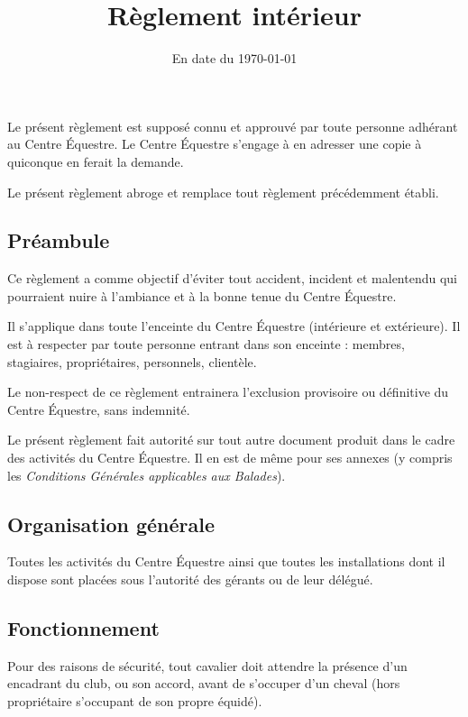 \documentclass[11pt,a4paper]{article}
\title[Règlement intérieur -- version du \today]{Règlement intérieur}
\subtitle{En date du \today}
\author{}
\date{}
\begin{document}

\maketitle


Le présent règlement est supposé connu et approuvé par toute personne adhérant au Centre Équestre.
Le Centre Équestre s'engage à en adresser une copie à quiconque en ferait la demande.

Le présent règlement abroge et remplace tout règlement précédemment établi.

\subsection*{Préambule}

Ce règlement a comme objectif d'éviter tout accident, incident et malentendu qui pourraient nuire à l'ambiance et à la bonne tenue du Centre Équestre.

Il s'applique dans toute l'enceinte du Centre Équestre (intérieure et extérieure).
Il est à respecter par toute personne entrant dans son enceinte : membres, stagiaires, propriétaires, personnels, clientèle.

Le non-respect de ce règlement entrainera l'exclusion provisoire ou définitive du Centre Équestre, sans indemnité.

Le présent règlement fait autorité sur tout autre document produit dans le cadre des activités du Centre Équestre.
Il en est de même pour ses annexes (y compris les \textit{Conditions Générales applicables aux Balades}).

\subsection{Organisation générale}\label{subsec:organisation-generale}
Toutes les activités du Centre Équestre ainsi que toutes les installations dont il dispose sont placées sous l'autorité des gérants ou de leur délégué.

\subsection{Fonctionnement}\label{subsec:fonctionnement}
Pour des raisons de sécurité, tout cavalier doit attendre la présence d'un encadrant du club, ou son accord, avant de s'occuper d'un cheval (hors propriétaire s'occupant de son propre équidé).
\end{document}
